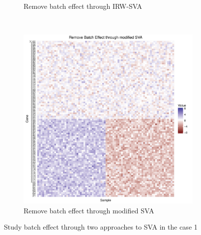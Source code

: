 \documentclass[11pt]{article}
\begin{document}
\begin{figure}[h!]
\begin{subfigure}[b]{0.3\textwidth}
        \caption{Remove batch effect through IRW-SVA}
    \end{subfigure}  %
~
    \begin{subfigure}[b]{0.3\textwidth}
        \centering
        \includegraphics[width = \textwidth]{figures/new_sva4.pdf}
        \caption{Remove batch effect through modified SVA}
    \end{subfigure}    
    \caption{Study batch effect through two approaches to SVA in the case 1}
    \label{fig:sva1}
\end{figure}
\end{document}
